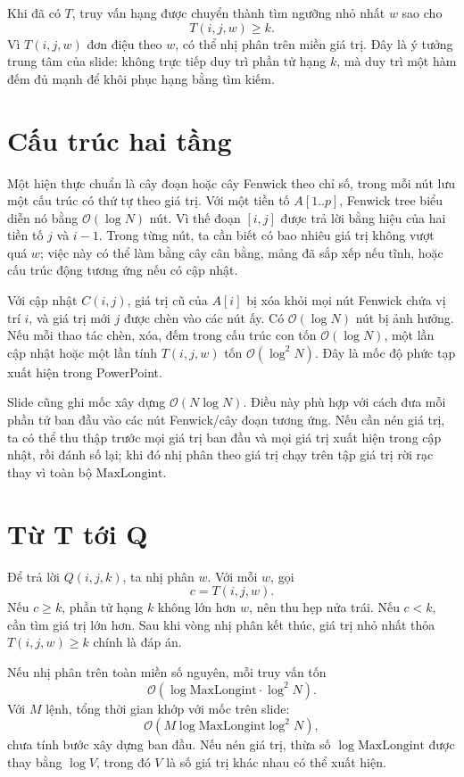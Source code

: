 \documentclass[11pt]{article}
\newcommand{\Oh}{\mathcal{O}}
\begin{document}
Khi đã có \(T\), truy vấn hạng được chuyển thành tìm ngưỡng nhỏ nhất \(w\) sao
cho
\[
  T(i,j,w)\ge k.
\]
Vì \(T(i,j,w)\) đơn điệu theo \(w\), có thể nhị phân trên miền giá trị. Đây là
ý tưởng trung tâm của slide: không trực tiếp duy trì phần tử hạng \(k\), mà
duy trì một hàm đếm đủ mạnh để khôi phục hạng bằng tìm kiếm.

\section{Cấu trúc hai tầng}

Một hiện thực chuẩn là cây đoạn hoặc cây Fenwick theo chỉ số, trong mỗi nút
lưu một cấu trúc có thứ tự theo giá trị. Với một tiền tố \(A[1..p]\), Fenwick
tree biểu diễn nó bằng \(\Oh(\log N)\) nút. Vì thế đoạn \([i,j]\) được trả lời
bằng hiệu của hai tiền tố \(j\) và \(i-1\). Trong từng nút, ta cần biết có bao
nhiêu giá trị không vượt quá \(w\); việc này có thể làm bằng cây cân bằng,
mảng đã sắp xếp nếu tĩnh, hoặc cấu trúc động tương ứng nếu có cập nhật.

Với cập nhật \(C(i,j)\), giá trị cũ của \(A[i]\) bị xóa khỏi mọi nút Fenwick
chứa vị trí \(i\), và giá trị mới \(j\) được chèn vào các nút ấy. Có
\(\Oh(\log N)\) nút bị ảnh hưởng. Nếu mỗi thao tác chèn, xóa, đếm trong cấu
trúc con tốn \(\Oh(\log N)\), một lần cập nhật hoặc một lần tính \(T(i,j,w)\)
tốn \(\Oh(\log^2 N)\). Đây là mốc độ phức tạp xuất hiện trong PowerPoint.

Slide cũng ghi mốc xây dựng \(\Oh(N\log N)\). Điều này phù hợp với cách đưa
mỗi phần tử ban đầu vào các nút Fenwick/cây đoạn tương ứng. Nếu cần nén giá
trị, ta có thể thu thập trước mọi giá trị ban đầu và mọi giá trị xuất hiện
trong cập nhật, rồi đánh số lại; khi đó nhị phân theo giá trị chạy trên tập
giá trị rời rạc thay vì toàn bộ \(\mathrm{MaxLongint}\).

\section{Từ T tới Q}

Để trả lời \(Q(i,j,k)\), ta nhị phân \(w\). Với mỗi \(w\), gọi
\[
  c=T(i,j,w).
\]
Nếu \(c\ge k\), phần tử hạng \(k\) không lớn hơn \(w\), nên thu hẹp nửa trái.
Nếu \(c<k\), cần tìm giá trị lớn hơn. Sau khi vòng nhị phân kết thúc, giá trị
nhỏ nhất thỏa \(T(i,j,w)\ge k\) chính là đáp án.

Nếu nhị phân trên toàn miền số nguyên, mỗi truy vấn tốn
\[
  \Oh(\log\mathrm{MaxLongint}\cdot\log^2 N).
\]
Với \(M\) lệnh, tổng thời gian khớp với mốc trên slide:
\[
  \Oh(M\log\mathrm{MaxLongint}\log^2 N),
\]
chưa tính bước xây dựng ban đầu. Nếu nén giá trị, thừa số
\(\log\mathrm{MaxLongint}\) được thay bằng \(\log V\), trong đó \(V\) là số
giá trị khác nhau có thể xuất hiện.
\end{document}
